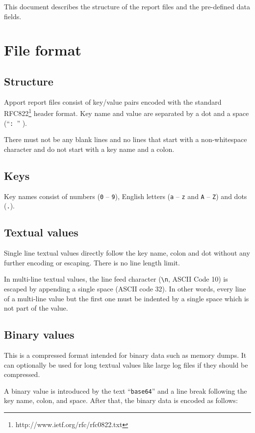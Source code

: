 \documentclass[DIV12,halfparskip]{scrartcl}
\begin{document}
This document describes the structure of the report files and the pre-defined data
fields.

\section{File format}

\subsection{Structure}

Apport report files consist of key/value pairs encoded with the standard
RFC822\footnote{http://www.ietf.org/rfc/rfc0822.txt} header format. Key name
and value are separated by a dot and a space (``\verb!: !'' ).

There must not be any blank lines and no lines that start with a non-whitespace
character and do not start with a key name and a colon.

\subsection{Keys}

Key names consist of numbers (\verb!0! -- \verb!9!), English letters (\verb!a!
-- \verb!z! and \verb!A! -- \verb!Z!) and dots (\verb!.!).

\subsection{Textual values}

Single line textual values directly follow the key name, colon and dot without
any further encoding or escaping. There is no line length limit.

In multi-line textual values, the line feed character (\verb!\n!, ASCII Code
10) is escaped by appending a single space (ASCII code 32). In other words,
every line of a multi-line value but the first one must be indented by a single
space which is not part of the value.

\subsection{Binary values}

This is a compressed format intended for binary data such as memory dumps. It
can optionally be used for long textual values like large log files if they
should be compressed.

A binary value is introduced by the text ``\verb!base64!'' and a line break
following the key name, colon, and space. After that, the binary data is
encoded as follows:
\end{document}
